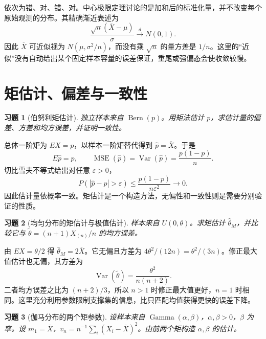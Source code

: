 \documentclass[UTF8,12pt,a4paper,fontset=fandol]{ctexart}
\newtheorem{exercise}{习题}[section]
\begin{document}
\begin{solve}\label{a:M-F-C13}依次为错、对、错、对。中心极限定理讨论的是加和后的标准化量，并不改变每个原始观测的分布。其精确渐近表述为\[\frac{\sqrt n(\overline X-\mu)}{\sigma}\xrightarrow{d}N(0,1).\]因此 $\overline X$ 可近似视为 $N(\mu,\sigma^2/n)$，而没有乘 $\sqrt n$ 的量方差是 $1/n$。这里的“近似”没有自动给出某个固定样本容量的误差保证，重尾或强偏态会使收敛较慢。\end{solve}

\clearpage\section{矩估计、偏差与一致性}

\begin{exercise}[伯努利矩估计]\label{q:B9.1}
独立样本来自 $\operatorname{Bern}(p)$。用矩法估计 $p$，求估计量的偏差、方差和均方误差，并证明一致性。\par{}
\end{exercise}

\begin{solve}\label{a:B9.1}总体一阶矩为 $EX=p$，以样本一阶矩替代得到 $\widehat p=\overline X$。于是\[E\widehat p=p,\qquad\operatorname{MSE}(\widehat p)=\operatorname{Var}(\widehat p)=\frac{p(1-p)}n.\]切比雪夫不等式给出对任意 $\varepsilon>0$，\[P(|\widehat p-p|>\varepsilon)\le\frac{p(1-p)}{n\varepsilon^2}\longrightarrow0.\]因此估计量依概率一致。矩估计是一个构造方法，无偏性和一致性则是需要分别验证的性质。\end{solve}

\begin{exercise}[均匀分布的矩估计与极值估计]\label{q:B9.2}
样本来自 $U(0,\theta)$。求矩估计 $\widehat\theta_M$，并比较它与 $\widetilde\theta=(n+1)X_{(n)}/n$ 的均方误差。\par{}
\end{exercise}

\begin{solve}\label{a:B9.2}由 $EX=\theta/2$ 得 $\widehat\theta_M=2\overline X$。它无偏且方差为 $4\theta^2/(12n)=\theta^2/(3n)$。修正最大值估计也无偏，其方差为\[\operatorname{Var}(\widetilde\theta)=\frac{\theta^2}{n(n+2)}.\]二者均方误差之比为 $(n+2)/3$，所以 $n>1$ 时修正最大值更好，$n=1$ 时相同。这里充分利用参数限制支撑集的信息，比只匹配均值获得更快的误差下降。\end{solve}

\begin{exercise}[伽马分布的两个矩参数]\label{q:B9.3}
设样本来自 $\operatorname{Gamma}(\alpha,\beta)$，$\alpha,\beta>0$，$\beta$ 为率。设 $m_1=\overline X$，$v_n=n^{-1}\sum_i(X_i-\overline X)^2$。由前两个矩构造 $\alpha,\beta$ 的估计。\par{}
\end{exercise}
\end{document}
